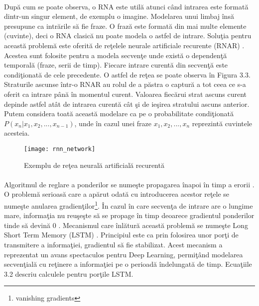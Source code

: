 \paragraph{}
Dup\u a cum se poate observa, o RNA este util\u a atunci c\^ and intrarea este format\u a dintr-un singur element, de exemplu o imagine. Modelarea unui limbaj \^ ins\u a presupune ca intr\u arile s\u a fie fraze. O fraz\u a este format\u a din mai multe elemente (cuvinte), deci o RNA clasic\u a nu poate modela o astfel de intrare. Solu\c tia pentru aceast\u a problem\u a este oferit\u a de re\c telele neurale artificiale recurente (RNAR) \cite{rnns}. Acestea sunt folosite pentru a modela secven\c te unde exist\u a o dependen\c t\u a temporal\u a (fraze, serii de timp). Fiecare intrare curent\u a din secven\c t\u a este condi\c tionat\u a de cele precedente. O astfel de re\c tea se poate observa \^ in Figura 3.3. Straturile ascunse \^ intr-o RNAR au rolul de a p\u astra o captur\u a a tot ceea ce s-a oferit ca intrare p\^ an\u a \^ in momentul curent. Valoarea fiec\u arui strat ascuns curent depinde astfel at\^ at de intrarea curent\u a c\^ at \c si de ie\c sirea stratului ascuns anterior. Putem considera toat\u a aceast\u a modelare ca pe o probabilitate condi\c tionat\u a \( P(x_{n} | x_{1}, x_{2},..., x_{n-1}) \), unde \^ in cazul unei fraze \(x_{1}, x_{2},..., x_{n}\) reprezint\u a cuvintele acesteia. 

\begin{figure}[H]
\centering
\texttt{[image: rnn\_network]}
\caption{Exemplu de re\c tea neural\u a artificial\u a recurent\u a}
\end{figure}

\paragraph{}
Algoritmul de reglare a ponderilor se nume\c ste propagarea \^ inapoi \^ in timp a erorii \cite{Mozer:1995:FBA:201784.201791}. O problem\u a serioas\u a care a ap\u arut odat\u a cu introducerea acestor re\c tele se nume\c ste anularea gradien\c tilor\footnote{vanishing gradients}. \^ In cazul \^ in care secven\c ta de intrare are o lungime mare, informa\c tia nu reu\c se\c ste s\u a se propage \^ in timp deoarece gradientul ponderilor tinde s\u a devin\u a \(0\) \cite{Hochreiter:1998:VGP:353515.355233}. Mecanismul care \^ inl\u atur\u a aceast\u a problem\u a se nume\c ste Long Short Term Memory (LSTM) \cite{Hochreiter:1997:LSM:1246443.1246450}. Principiul este ca prin folosirea unor por\c ti de transmitere a informa\c tiei, gradientul s\u a fie stabilizat. Acest mecanism a reprezentat un avans spectaculos pentru Deep Learning, permi\c t\^ and modelarea secven\c tial\u a cu re\c tinere a informa\c tiei pe o perioad\u a \^ indelungat\u a de timp. Ecua\c tiile 3.2 descriu calculele pentru por\c tile LSTM.

